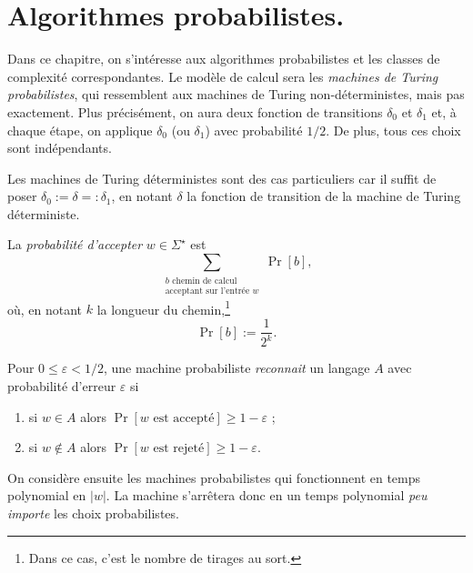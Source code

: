 \documentclass[./main]{subfiles}
\begin{document}
  \chapter{Algorithmes probabilistes.}

  Dans ce chapitre, on s'intéresse aux algorithmes probabilistes et les classes de complexité correspondantes.
  Le modèle de calcul sera les \textit{machines de Turing probabilistes}, qui ressemblent aux machines de Turing non-déterministes, mais pas exactement. Plus précisément, on aura deux fonction de transitions $\delta_0$ et $\delta_1$ et, à chaque étape, on applique $\delta_0$ (ou $\delta_1$) avec probabilité $1 / 2$.
  De plus, tous ces choix sont indépendants.

  \begin{rmk}
    Les machines de Turing déterministes sont des cas particuliers car il suffit de poser $\delta_0 := \delta =: \delta_1$, en notant $\delta$ la fonction de transition de la machine de Turing déterministe.
  \end{rmk}

  \begin{defn}
    La \textit{probabilité d'accepter} $w \in \Sigma^\star$ est
    \[
    \sum_{
      \begin{array}{c}
        \text{$b$ chemin de calcul}\\
        \text{acceptant sur l'entrée $w$}
      \end{array}
    } \Pr[b]
    ,\] 
    où, en notant $k$ la longueur du chemin,\footnote{Dans ce cas, c'est le nombre de tirages au sort.}
    \[
      \Pr[b] := \frac{1}{2^k}
    .\] 
  \end{defn}

  \begin{defn}
    Pour $0 \le \varepsilon < 1/2$, une machine probabiliste \textit{reconnait} un langage $A$ avec probabilité d'erreur $\varepsilon$ si
    \begin{enumerate}
      \item si $w \in A$ alors $\Pr[\text{$w$ est accepté}] \ge 1 - \varepsilon$ ;
      \item si $w \not\in A$ alors $\Pr[\text{$w$ est rejeté}] \ge 1 - \varepsilon$.
    \end{enumerate}
  \end{defn}

  On considère ensuite les machines probabilistes qui fonctionnent en temps polynomial en $|w|$.
  La machine s'arrêtera donc en un temps polynomial \textit{peu importe} les choix probabilistes.
\end{document}
